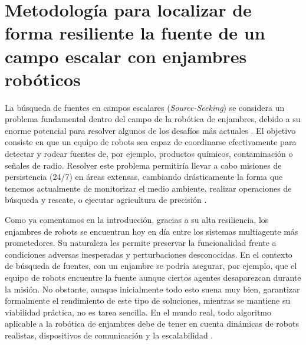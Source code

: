 \section{Metodología para localizar de forma resiliente la fuente de un campo escalar con enjambres robóticos}


La búsqueda de fuentes en campos escalares (\textit{Source-Seeking}) se considera un problema fundamental dentro del campo de la robótica de enjambres, debido a su enorme potencial para resolver algunos de los desafíos más actuales \cite{brambilla2013swarm}. El objetivo consiste en que un equipo de robots sea capaz de coordinarse efectivamente para detectar y rodear fuentes de, por ejemplo, productos químicos, contaminación o señales de radio. Resolver este problema permitiría llevar a cabo misiones de persistencia (24/7) en áreas extensas, cambiando drásticamente la forma que tenemos actualmente de monitorizar el medio ambiente, realizar operaciones de búsqueda y rescate, o ejecutar agricultura de precisión \cite{ogren2004cooperative, kumar2004robot, mcguire2019minimal, li2006moth,twigg2012rss}. 

Como ya comentamos en la introducción, gracias a su alta resiliencia, los enjambres de robots se encuentran hoy en día entre los sistemas multiagente más prometedores. Su naturaleza les permite preservar la funcionalidad frente a condiciones adversas inesperadas y perturbaciones desconocidas. En el contexto de búsqueda de fuentes, con un enjambre se podría asegurar, por ejemplo, que el equipo de robots encuentre la fuente aunque ciertos agentes desaparezcan durante la misión. No obstante, aunque inicialmente todo esto suena muy bien, garantizar formalmente el rendimiento de este tipo de soluciones, mientras se mantiene su viabilidad práctica, no es tarea sencilla. En el mundo real, todo algoritmo aplicable a la robótica de enjambres debe de tener en cuenta dinámicas de robots realistas, dispositivos de comunicación y la escalabilidad \cite{dorigo2021swarm}.

\vspace{0.4cm}

